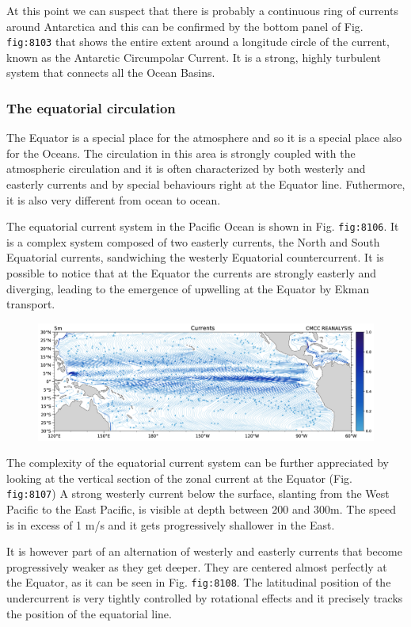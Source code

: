 At this point we can suspect that there is probably a continuous ring of
currents around Antarctica and this can be confirmed by the bottom panel
of Fig. \texttt{fig:8103} that shows the entire extent around a
longitude circle of the current, known as the Antarctic Circumpolar
Current. It is a strong, highly turbulent system that connects all the
Ocean Basins.

\subsubsection{The equatorial
	circulation}\label{the-equatorial-circulation}

The Equator is a special place for the atmosphere and so it is a special
place also for the Oceans. The circulation in this area is strongly
coupled with the atmospheric circulation and it is often characterized
by both westerly and easterly currents and by special behaviours right
at the Equator line. Futhermore, it is also very different from ocean to
ocean.

The equatorial current system in the Pacific Ocean is shown in Fig.
\texttt{fig:8106}. It is a complex system composed of two easterly
currents, the North and South Equatorial currents, sandwiching the
westerly Equatorial countercurrent. It is possible to notice that at the
Equator the currents are strongly easterly and diverging, leading to the
emergence of upwelling at the Equator by Ekman transport.

\begin{figure}
	\centering
	\includegraphics[width = .7 \textwidth]{figs/GD/UVstream5mPac.png}
	\caption{} \label{fig:}
\end{figure}

The complexity of the equatorial current system can be further
appreciated by looking at the vertical section of the zonal current at
the Equator (Fig. \texttt{fig:8107}) A strong westerly current below the
surface, slanting from the West Pacific to the East Pacific, is visible
at depth between 200 and 300m. The speed is in excess of 1 m/s and it
gets progressively shallower in the East.

It is however part of an alternation of westerly and easterly currents
that become progressively weaker as they get deeper. They are centered
almost perfectly at the Equator, as it can be seen in Fig.
\texttt{fig:8108}. The latitudinal position of the undercurrent is very
tightly controlled by rotational effects and it precisely tracks the
position of the equatorial line.

